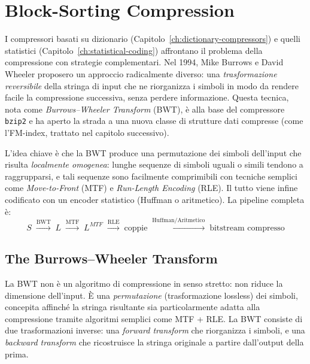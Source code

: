 \documentclass[12pt, a4paper, oneside]{book}
\theoremstyle{plain}
\theoremstyle{definition}
\theoremstyle{remark}
\begin{document}
\chapter{Block-Sorting Compression}
\label{ch:bwt}

I compressori basati su dizionario (Capitolo~\ref{ch:dictionary-compressors}) e quelli statistici (Capitolo~\ref{ch:statistical-coding}) affrontano il problema della compressione con strategie complementari. Nel 1994, Mike Burrows e David Wheeler proposero un approccio radicalmente diverso: una \emph{trasformazione reversibile} della stringa di input che ne riorganizza i simboli in modo da rendere facile la compressione successiva, senza perdere informazione. Questa tecnica, nota come \emph{Burrows--Wheeler Transform} (BWT), è alla base del compressore \texttt{bzip2} e ha aperto la strada a una nuova classe di strutture dati compresse (come l'FM-index, trattato nel capitolo successivo).

L'idea chiave è che la BWT produce una permutazione dei simboli dell'input che risulta \emph{localmente omogenea}: lunghe sequenze di simboli uguali o simili tendono a raggrupparsi, e tali sequenze sono facilmente comprimibili con tecniche semplici come \emph{Move-to-Front} (MTF) e \emph{Run-Length Encoding} (RLE). Il tutto viene infine codificato con un encoder statistico (Huffman o aritmetico). La pipeline completa è:
\[
  S \;\xrightarrow{\text{BWT}}\; L \;\xrightarrow{\text{MTF}}\; L^{MTF} \;\xrightarrow{\text{RLE}}\; \text{coppie} \;\xrightarrow{\text{Huffman/Aritmetico}}\; \text{bitstream compresso}
\]

\section{The Burrows--Wheeler Transform}
\label{sec:bwt-transform}

La BWT non è un algoritmo di compressione in senso stretto: non riduce la dimensione dell'input. È una \emph{permutazione} (trasformazione lossless) dei simboli, concepita affinché la stringa risultante sia particolarmente adatta alla compressione tramite algoritmi semplici come MTF + RLE. La BWT consiste di due trasformazioni inverse: una \emph{forward transform} che riorganizza i simboli, e una \emph{backward transform} che ricostruisce la stringa originale a partire dall'output della prima.

\end{document}
